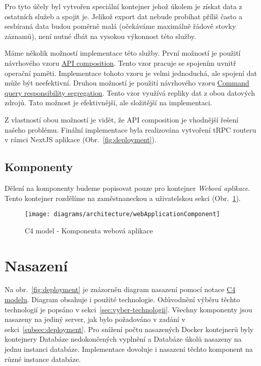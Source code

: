 Pro tyto účely byl vytvořen speciální kontejner jehož úkolem je získat data z ostatních služeb a spojit je.
Jelikož export dat nebude probíhat příliš často a sesbíraná data budou poměrně malá (očekáváme maximálně řádově stovky záznamů), není nutné dbát na vysokou výkonnost této služby.

Máme několik možností implementace této služby.
První možností je použití návrhového vzoru \href{https://microservices.io/patterns/data/api-composition.html}{API composition}.
Tento vzor pracuje se spojením uvnitř operační paměti.
Implementace tohoto vzoru je velmi jednoduchá, ale spojení dat může být neefektivní.
Druhou možností je použití návrhového vzoru \href{https://microservices.io/patterns/data/cqrs.html}{Command query responsibility segregation}.
Tento vzor využívá repliky dat z obou datových zdrojů.
Tato možnost je efektivnější, ale složitější na implementaci.

Z vlastností obou možností je vidět, že API composition je vhodnější řešení našeho problému.
Finální implementace byla realizována vytvoření tRPC routeru v rámci NextJS aplikace (Obr.~\ref{fig:deployment}).

\subsection{Komponenty}\label{subsec:komponenty}

Dělení na komponenty budeme popisovat pouze pro kontejner \textit{Webová aplikace}.
Tento kontejner rozdělíme na zaměstnaneckou a uživatelskou sekci (Obr.~\ref{fig:architecture-component-web-application}).

\begin{figure}[H]
    \centering
    \texttt{[image: diagrams/architecture/webApplicationComponent]}
    \caption{C4 model - Komponenta webová aplikace}\label{fig:architecture-component-web-application}
\end{figure}


\section{Nasazení}\label{sec:deployment}

Na obr.~\ref{fig:deployment} je znázorněn diagram nasazení pomocí notace \href{https://c4model.com/#DeploymentDiagram}{C4 modelu}.
Diagram obsahuje i použité technologie.
Odůvodnění výběru těchto technologií je popsáno v sekci~\ref{sec:vyber-technologii}.
Všechny komponenty jsou nasazeny na jediný server, jak bylo požadováno v zadání v sekci~\ref{subsec:deployment}.
Pro snížení počtu nasazených Docker kontejnerů byly kontejnery Databáze nedokončených vyplnění a Databáze úkolů nasazeny na jednu instanci databáze.
Implementace dovoluje i nasazení těchto komponent na různé instance databáze.

